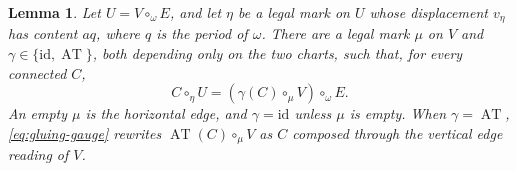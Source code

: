 \documentclass[11pt,a4paper]{amsart}
\numberwithin{equation}{section}
\theoremstyle{plain}
\newtheorem{lemma}[theorem]{Lemma}
\theoremstyle{definition}
\begin{document}
\begin{lemma}\label{lem:gluing-aligned}
Let \(U=V\circ_\omega E\), and let \(\eta\) be a legal mark on \(U\) whose displacement \(v_\eta\) has content \(aq\), where \(q\) is the period of \(\omega\).  There are a legal mark \(\mu\) on \(V\) and \(\gamma\in\{\mathrm{id},\operatorname{AT}\}\), both depending only on the two charts, such that, for every connected \(C\),
\begin{equation}\label{eq:gluing-reassociation}
 C\circ_\eta U=(\gamma(C)\circ_\mu V)\circ_\omega E.
\end{equation}
An empty \(\mu\) is the horizontal edge, and \(\gamma=\mathrm{id}\) unless \(\mu\) is empty.  When \(\gamma=\operatorname{AT}\), \eqref{eq:gluing-gauge} rewrites \(\operatorname{AT}(C)\circ_\mu V\) as \(C\) composed through the vertical edge reading of \(V\).
\end{lemma}
\end{document}
